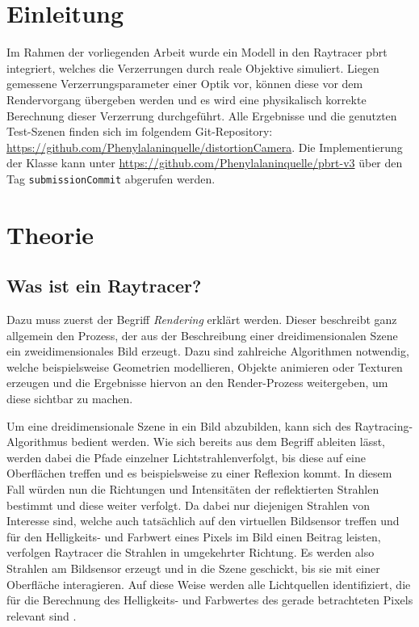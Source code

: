 \section{Einleitung}

Im Rahmen der vorliegenden Arbeit wurde ein Modell in den Raytracer pbrt integriert, welches die Verzerrungen durch reale Objektive simuliert. Liegen gemessene Verzerrungsparameter einer Optik vor, können diese vor dem Rendervorgang übergeben werden und es wird eine physikalisch korrekte Berechnung dieser Verzerrung durchgeführt.
Alle Ergebnisse und die genutzten Test-Szenen finden sich im folgendem Git-Repository: \url{https://github.com/Phenylalaninquelle/distortionCamera}. Die Implementierung der Klasse kann unter \url{https://github.com/Phenylalaninquelle/pbrt-v3} über den Tag \texttt{submissionCommit} abgerufen werden.

\section{Theorie}

\subsection{Was ist ein Raytracer?}\label{sec:Raytracer}

Dazu muss zuerst der Begriff \textit{Rendering} erklärt werden. Dieser beschreibt ganz allgemein den Prozess, der aus der Beschreibung einer dreidimensionalen Szene ein zweidimensionales Bild erzeugt. Dazu sind zahlreiche Algorithmen notwendig, welche beispielsweise Geometrien modellieren, Objekte animieren oder Texturen erzeugen und die Ergebnisse hiervon an den Render-Prozess weitergeben, um diese sichtbar zu machen. 

Um eine dreidimensionale Szene in ein Bild abzubilden, kann sich des Raytracing-Algorithmus bedient werden. Wie sich bereits aus dem Begriff ableiten lässt, werden dabei die Pfade einzelner \glqq Lichtstrahlen\grqq{ }verfolgt, bis diese auf eine Oberflächen treffen und es beispielsweise zu einer Reflexion kommt. In diesem Fall würden nun die Richtungen und Intensitäten der reflektierten Strahlen bestimmt und diese weiter verfolgt.
Da dabei nur diejenigen Strahlen von Interesse sind, welche auch tatsächlich auf den virtuellen Bildsensor treffen und für den Helligkeits- und Farbwert eines Pixels im Bild einen Beitrag leisten, verfolgen Raytracer die Strahlen in umgekehrter Richtung. Es werden also Strahlen am Bildsensor erzeugt und in die Szene geschickt, bis sie mit einer Oberfläche interagieren. Auf diese Weise werden alle Lichtquellen identifiziert, die für die Berechnung des Helligkeits- und Farbwertes des gerade betrachteten Pixels relevant sind \cite{pbrt_book}. 

